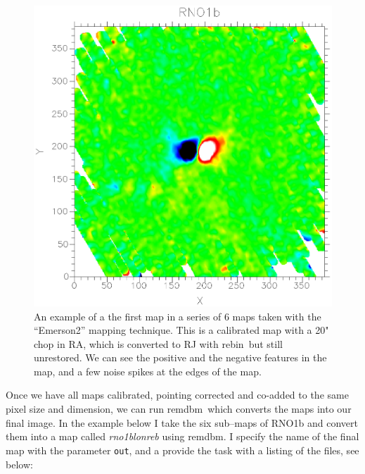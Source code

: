\documentclass[twoside,11pt]{article}
\newcommand{\task}[1]{\textsf{#1}}
\newcommand{\rebin}{\xref{\task{rebin}}{sun216}{REBIN}}
\newcommand{\remdbm}{\xref{\task{remdbm}}{sun216}{REMDBM}}
\newcommand{\xref}[3]{#1}
\renewcommand{\_}{\texttt{\symbol{95}}}
\begin{document}
\begin{figure}
\begin{center}
\includegraphics[width=\textwidth]{sho_fig6.eps}
\caption{An example of a the first map in a series of 6 maps taken with the ``Emerson2'' mapping technique. This is a calibrated map with a 20" chop in RA, which is converted to RJ with \rebin\, but still unrestored. We can see the positive and the negative features in the map, and a few noise spikes at the edges of the map.}
\label{fig:dual}
\end{center}
\end{figure}


Once we have all maps calibrated, pointing corrected and co-added to the same 
pixel size and dimension, we can run \remdbm\, which converts the maps into 
our final image. In the example below I take the six sub--maps of RNO1b and  convert them into a map called {\it rno1b\_lon\_reb} using \remdbm. I specify the name of the final map with the parameter \texttt{out}, and a provide the task with a listing of the files, see below:
\end{document}
